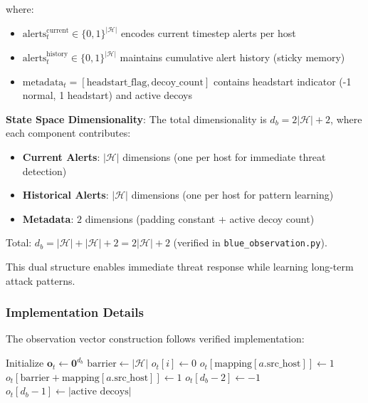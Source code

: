 \documentclass[12pt,twoside]{article}
\begin{document}
where:
\begin{itemize}
    \item $\text{alerts}_{t}^{\text{current}} \in \{0,1\}^{|\mathcal{H}|}$ encodes current timestep alerts per host
    \item $\text{alerts}_{t}^{\text{history}} \in \{0,1\}^{|\mathcal{H}|}$ maintains cumulative alert history (sticky memory)
    \item $\text{metadata}_t = [\text{headstart\_flag}, \text{decoy\_count}]$ contains headstart indicator (-1 normal, 1 headstart) and active decoys
\end{itemize}

\textbf{State Space Dimensionality}: The total dimensionality is $d_b = 2|\mathcal{H}| + 2$, where each component contributes:

\begin{itemize}
\item \textbf{Current Alerts}: $|\mathcal{H}|$ dimensions (one per host for immediate threat detection)
\item \textbf{Historical Alerts}: $|\mathcal{H}|$ dimensions (one per host for pattern learning)
\item \textbf{Metadata}: $2$ dimensions (padding constant + active decoy count)
\end{itemize}

Total: $d_b = |\mathcal{H}| + |\mathcal{H}| + 2 = 2|\mathcal{H}| + 2$ (verified in \texttt{blue\_observation.py}).

This dual structure enables immediate threat response while learning long-term attack patterns.

\subsubsection{Implementation Details}
The observation vector construction follows verified implementation:

\begin{algorithm}
\caption{Blue Observation Vector Construction (Verified)}
\begin{algorithmic}[1]
\STATE Initialize $\mathbf{o}_t \leftarrow \mathbf{0}^{d_b}$
\STATE $\text{barrier} \leftarrow |\mathcal{H}|$
    \STATE $o_t[i] \leftarrow 0$ 
\ENDFOR
{}
        \STATE $o_t[\text{mapping}[a.\text{src\_host}]] \leftarrow 1$
        \STATE $o_t[\text{barrier} + \text{mapping}[a.\text{src\_host}]] \leftarrow 1$ 
    \ENDIF
\ENDFOR
\STATE $o_t[d_b-2] \leftarrow -1$ 
\STATE $o_t[d_b-1] \leftarrow |\text{active decoys}|$ 
\end{algorithmic}
\end{algorithm}
\end{document}
